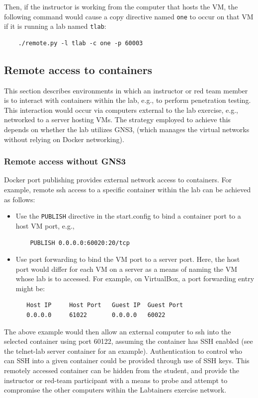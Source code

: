 \documentclass[12pt]{article}
\begin{document}
Then, if the instructor is working from the computer that hosts the VM, the following command would cause a copy 
directive named {\tt one} to occur on that VM if it is
running a lab named {\tt tlab}:
\begin{verbatim}
    ./remote.py -l tlab -c one -p 60003
\end{verbatim}

\subsection{Remote access to containers}
This section describes environments in which an instructor or red team member is to interact with containers within the lab,
e.g., to perform penetration testing.  This interaction would occur via computers external to the lab exercise, e.g., networked
to a server hosting VMs.  The strategy employed to achieve this depends on whether the lab utilizes GNS3, (which manages the virtual
networks without relying on Docker networking).

\subsubsection{Remote access without GNS3}
Docker port publishing provides external network access to containers.
For example, remote ssh access to a specific container within the lab can be achieved as follows:
\begin{itemize}
\item Use the {\tt PUBLISH} directive in the start.config to bind a container port to a host VM port, e.g.,
\begin{verbatim}
    PUBLISH 0.0.0.0:60020:20/tcp
\end{verbatim}
\item Use port forwarding to bind the VM port to a server port.  Here, the host port would differ for each VM on a server as a
means of naming the VM whose lab is to accessed.  For example, on VirtualBox, a port forwarding entry might be:
\begin{verbatim}
   Host IP     Host Port   Guest IP  Guest Port
   0.0.0.0     61022       0.0.0.0   60022
\end{verbatim}
\end{itemize}

\noindent The above example would then allow an external computer to ssh into the selected container using port 60122,
assuming the container has SSH enabled (see the telnet-lab server container for an example).  Authentication to control who can SSH
into a given container could be provided through use of SSH keys.  This remotely accessed container can be hidden from the student, and provide
the instructor or red-team participant with a means to probe and attempt to compromise the other computers within the Labtainers exercise network.
\end{document}
